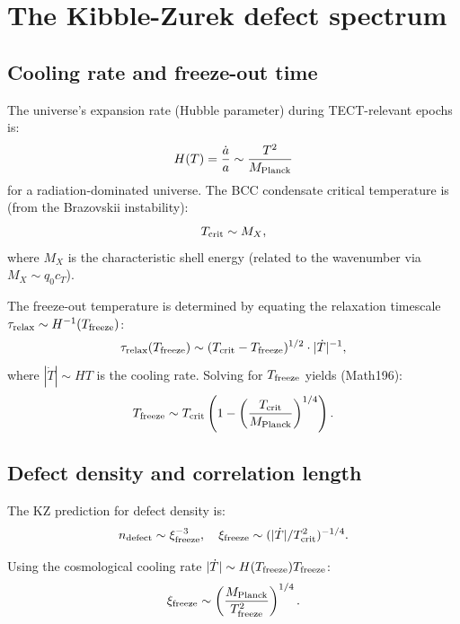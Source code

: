 \section{The Kibble-Zurek defect spectrum}

\subsection{Cooling rate and freeze-out time}

The universe's expansion rate (Hubble parameter) during TECT-relevant epochs is:
\begin{equation}
H(T) = \frac{\dot{a}}{a} \sim \frac{T^2}{M_{\rm Planck}}
\end{equation}
for a radiation-dominated universe. The BCC condensate critical temperature is
(from the Brazovskii instability):
\begin{equation}
T_{\rm crit} \sim M_X,
\end{equation}
where $M_X$ is the characteristic shell energy (related to the wavenumber via
$M_X \sim q_0 c_T$).

The freeze-out temperature is determined by equating the relaxation timescale
$\tau_{\rm relax} \sim H^{-1}(T_{\rm freeze})$:
\begin{equation}
\tau_{\rm relax}(T_{\rm freeze}) \sim (T_{\rm crit} - T_{\rm freeze})^{1/2} \cdot |\dot{T}|^{-1},
\end{equation}
where $|\dot{T}| \sim H T$ is the cooling rate. Solving for $T_{\rm freeze}$ yields
(Math196):
\begin{equation}
T_{\rm freeze} \sim T_{\rm crit} \left(1 - \left(\frac{T_{\rm crit}}{M_{\rm Planck}}\right)^{1/4}\right).
\end{equation}

\subsection{Defect density and correlation length}\label{sec:KZ-defect-density}

The KZ prediction for defect density is:
\begin{equation}
n_{\rm defect} \sim \xi_{\rm freeze}^{-3}, \quad \xi_{\rm freeze} \sim (|\dot{T}| / T_{\rm crit}^2)^{-1/4}.
\end{equation}

Using the cosmological cooling rate $|\dot{T}| \sim H(T_{\rm freeze}) T_{\rm freeze}$:
\begin{equation}
\xi_{\rm freeze} \sim \left(\frac{M_{\rm Planck}}{T_{\rm freeze}^2}\right)^{1/4}.
\end{equation}

